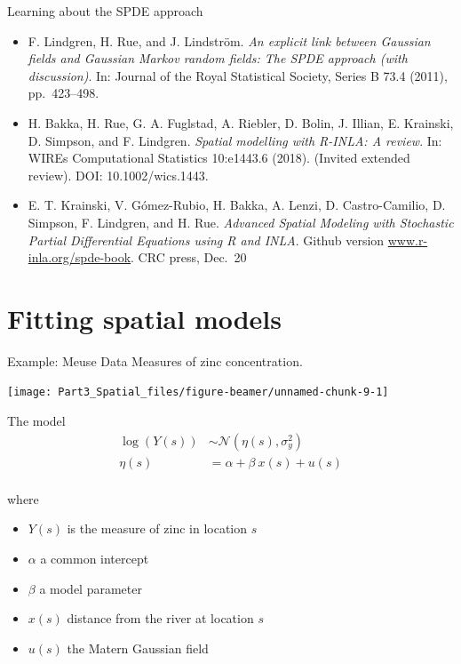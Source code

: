 \documentclass[
  ignorenonframetext,
]{beamer}
\begin{document}
\begin{frame}{Learning about the SPDE approach}
\protect\hypertarget{learning-about-the-spde-approach}{}
\begin{itemize}
\item
  F. Lindgren, H. Rue, and J. Lindström. \emph{An explicit link between
  Gaussian fields and Gaussian Markov random fields: The SPDE approach
  (with discussion)}. In: Journal of the Royal Statistical Society,
  Series B 73.4 (2011), pp.~423--498.
\item
  H. Bakka, H. Rue, G. A. Fuglstad, A. Riebler, D. Bolin, J. Illian, E.
  Krainski, D. Simpson, and F. Lindgren. \emph{Spatial modelling with
  R-INLA: A review}. In: WIREs Computational Statistics 10:e1443.6
  (2018). (Invited extended review). DOI: 10.1002/wics.1443.
\item
  E. T. Krainski, V. Gómez-Rubio, H. Bakka, A. Lenzi, D. Castro-Camilio,
  D. Simpson, F. Lindgren, and H. Rue. \emph{Advanced Spatial Modeling
  with Stochastic Partial Differential Equations using R and INLA}.
  Github version \url{www.r-inla.org/spde-book}. CRC press, Dec.~20
\end{itemize}
\end{frame}

\hypertarget{fitting-spatial-models}{%
\section{Fitting spatial models}\label{fitting-spatial-models}}

\begin{frame}{Example: Meuse Data}
\protect\hypertarget{example-meuse-data}{}
Measures of zinc concentration.

\begin{center}\texttt{[image: Part3\_Spatial\_files/figure-beamer/unnamed-chunk-9-1]} \end{center}
\end{frame}

\begin{frame}{The model}
\protect\hypertarget{the-model}{}
\[
\begin{aligned}
\log(Y(s)) &\sim \mathcal{N}(\eta(s),\sigma^2_y)\\
\eta(s)& = \alpha + \beta\ x(s) + u(s)\\
\end{aligned}
\]

where

\begin{itemize}
\item
  \(Y(s)\) is the measure of zinc in location \(s\)
\item
  \(\alpha\) a common intercept
\item
  \(\beta\) a model parameter
\item
  \(x(s)\) distance from the river at location \(s\)
\item
  \(u(s)\) the Matern Gaussian field
\end{itemize}
\end{frame}
\end{document}
